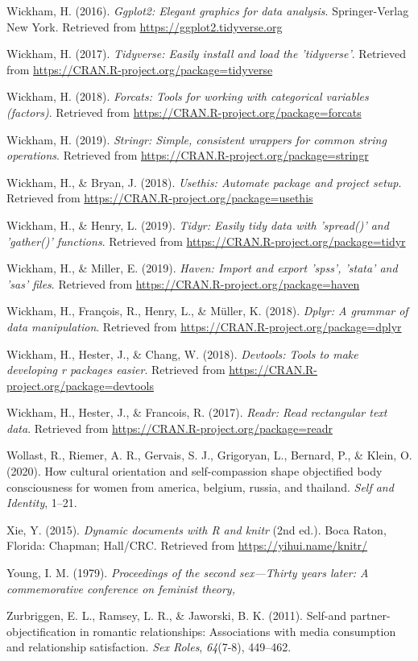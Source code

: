 \documentclass[man]{apa6}
\begin{document}
\hypertarget{ref-R-ggplot2}{}
Wickham, H. (2016). \emph{Ggplot2: Elegant graphics for data analysis}.
Springer-Verlag New York. Retrieved from
\url{https://ggplot2.tidyverse.org}

\hypertarget{ref-R-tidyverse}{}
Wickham, H. (2017). \emph{Tidyverse: Easily install and load the
'tidyverse'}. Retrieved from
\url{https://CRAN.R-project.org/package=tidyverse}

\hypertarget{ref-R-forcats}{}
Wickham, H. (2018). \emph{Forcats: Tools for working with categorical
variables (factors)}. Retrieved from
\url{https://CRAN.R-project.org/package=forcats}

\hypertarget{ref-R-stringr}{}
Wickham, H. (2019). \emph{Stringr: Simple, consistent wrappers for
common string operations}. Retrieved from
\url{https://CRAN.R-project.org/package=stringr}

\hypertarget{ref-R-usethis}{}
Wickham, H., \& Bryan, J. (2018). \emph{Usethis: Automate package and
project setup}. Retrieved from
\url{https://CRAN.R-project.org/package=usethis}

\hypertarget{ref-R-tidyr}{}
Wickham, H., \& Henry, L. (2019). \emph{Tidyr: Easily tidy data with
'spread()' and 'gather()' functions}. Retrieved from
\url{https://CRAN.R-project.org/package=tidyr}

\hypertarget{ref-R-haven}{}
Wickham, H., \& Miller, E. (2019). \emph{Haven: Import and export
'spss', 'stata' and 'sas' files}. Retrieved from
\url{https://CRAN.R-project.org/package=haven}

\hypertarget{ref-R-dplyr}{}
Wickham, H., François, R., Henry, L., \& Müller, K. (2018). \emph{Dplyr:
A grammar of data manipulation}. Retrieved from
\url{https://CRAN.R-project.org/package=dplyr}

\hypertarget{ref-R-devtools}{}
Wickham, H., Hester, J., \& Chang, W. (2018). \emph{Devtools: Tools to
make developing r packages easier}. Retrieved from
\url{https://CRAN.R-project.org/package=devtools}

\hypertarget{ref-R-readr}{}
Wickham, H., Hester, J., \& Francois, R. (2017). \emph{Readr: Read
rectangular text data}. Retrieved from
\url{https://CRAN.R-project.org/package=readr}

\hypertarget{ref-wollast2020cultural}{}
Wollast, R., Riemer, A. R., Gervais, S. J., Grigoryan, L., Bernard, P.,
\& Klein, O. (2020). How cultural orientation and self-compassion shape
objectified body consciousness for women from america, belgium, russia,
and thailand. \emph{Self and Identity}, 1--21.

\hypertarget{ref-R-knitr}{}
Xie, Y. (2015). \emph{Dynamic documents with R and knitr} (2nd ed.).
Boca Raton, Florida: Chapman; Hall/CRC. Retrieved from
\url{https://yihui.name/knitr/}

\hypertarget{ref-young1979}{}
Young, I. M. (1979). \emph{Proceedings of the second sex---Thirty years
later: A commemorative conference on feminist theory,}

\hypertarget{ref-zurbriggen2011self}{}
Zurbriggen, E. L., Ramsey, L. R., \& Jaworski, B. K. (2011). Self-and
partner-objectification in romantic relationships: Associations with
media consumption and relationship satisfaction. \emph{Sex Roles},
\emph{64}(7-8), 449--462.

\endgroup
\end{document}
